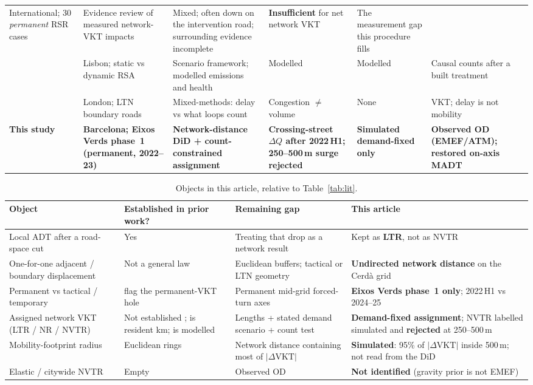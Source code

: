\documentclass[a4paper,fleqn]{cas-dc}
\newcommand{\DQ}{\Delta Q}
\newcommand{\DVKT}{\Delta\mathrm{VKT}}
\begin{document}
\begin{table}
\begin{tabular}{@{}Y{2.15cm}Y{2.35cm}Y{2.55cm}Y{2.15cm}Y{2.15cm}Y{2.55cm}@{}}
International; 30 \emph{permanent} RSR cases &
Evidence review of measured network-VKT impacts &
Mixed; often down on the intervention road; surrounding evidence incomplete &
\textbf{Insufficient} for net network VKT &
The measurement gap this procedure fills \\
\addlinespace
\citet{Matajs2026} &
Lisbon; static vs dynamic RSA &
Scenario framework; modelled emissions and health &
Modelled &
Modelled &
Causal counts after a built treatment \\
\addlinespace
\citet{Verlinghieri2025} &
London; LTN boundary roads &
Mixed-methods: delay vs what loops count &
Congestion $\neq$ volume &
None &
VKT; delay is not mobility \\
\addlinespace
\textbf{This study} &
\textbf{Barcelona; Eixos Verds phase~1 (permanent, 2022--23)} &
\textbf{Network-distance DiD + count-constrained assignment} &
\textbf{Crossing-street $\DQ$ after 2022\,H1; 250--500\,m surge rejected} &
\textbf{Simulated demand-fixed only} &
\textbf{Observed OD (EMEF/ATM); restored on-axis MADT} \\
\bottomrule
\end{tabular}
\end{table}

\begin{table}
\caption{Objects in this article, relative to Table~\ref{tab:lit}.}
\label{tab:gap}
\centering
\small
\begin{tabular}{@{}Y{3.2cm}Y{4.0cm}Y{3.6cm}Y{4.0cm}@{}}
\toprule
Object & Established in prior work? & Remaining gap & This article \\
\midrule
Local ADT after a road-space cut &
Yes \citep{Cairns1998,NelloDeakin2022,Thomas2024} &
Treating that drop as a network result &
Kept as \textbf{LTR}, not as NVTR \\
\addlinespace
One-for-one adjacent / boundary displacement &
Not a general law \citep{NelloDeakin2022,Thomas2024,Parady2025} &
Euclidean buffers; tactical or LTN geometry &
\textbf{Undirected network distance} on the Cerd\`a grid \\
\addlinespace
Permanent vs tactical / temporary &
\citet{Koorey2025} flag the permanent-VKT hole &
Permanent mid-grid forced-turn axes &
\textbf{Eixos Verds phase~1 only}; 2022\,H1 vs 2024--25 \\
\addlinespace
Assigned network VKT (LTR / NR / NVTR) &
Not established \citep{Koorey2025}; \citet{Goodman2023} is resident km; \citet{Matajs2026} is modelled &
Lengths + stated demand scenario + count test &
\textbf{Demand-fixed assignment}; NVTR labelled simulated and \textbf{rejected} at 250--500\,m \\
\addlinespace
Mobility-footprint radius &
Euclidean rings \citep{Parady2025} &
Network distance containing most of $|\DVKT|$ &
\textbf{Simulated}: 95\% of $|\DVKT|$ inside 500\,m; not read from the DiD \\
\addlinespace
Elastic / citywide NVTR &
Empty &
Observed OD &
\textbf{Not identified} (gravity prior is not EMEF) \\
\bottomrule
\end{tabular}
\end{table}
\end{document}
